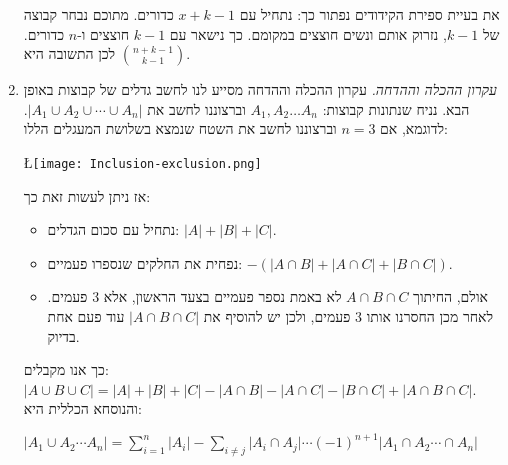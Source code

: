 \documentclass[12pt,a4paper]{article}
\begin{document}
\begin{enumerate}[label=\textcolor{BurntOrange}{שאלה \arabic*: }]
\begin{Solution}
את בעיית ספירת הקידודים נפתור כך: נתחיל עם $x+k-1$ כדורים. מתוכם נבחר קבוצה של $k-1$, נזרוק אותם ונשים חוצצים במקומם. כך נישאר עם $k-1$ חוצצים ו-$n$ כדורים. לכן התשובה היא $\binom{n+k-1}{k-1}$.
\end{Solution}
\item \textit{עקרון ההכלה וההדחה.} עקרון ההכלה וההדחה מסייע לנו לחשב גדלים של קבוצות באופן הבא. נניח שנתונות קבוצות: $A_1 , A_2 \dots A_n$ וברצוננו לחשב את $\lvert A_1 \cup A_2 \cup \cdots \cup A_n \rvert$. לדוגמא, אם $n=3$ וברצוננו לחשב את השטח שנמצא בשלושת המעגלים הללו:
\begin{center}
\L {\texttt{[image: Inclusion-exclusion.png]}}
\end{center}
אז ניתן לעשות זאת כך:
\begin{itemize}
\item נתחיל עם סכום הגדלים: $\lvert A \rvert + \lvert B \rvert + \lvert C \rvert$.
\item נפחית את החלקים שנספרו פעמיים: $-(\lvert A \cap B \rvert + \lvert A \cap C \rvert + \lvert B \cap C \rvert)$.
\item אולם, החיתוך $A \cap B \cap C$ לא באמת נספר פעמיים בצעד הראשון, אלא 3 פעמים. לאחר מכן החסרנו אותו 3 פעמים, ולכן יש להוסיף את $\lvert A \cap B \cap C \rvert$ עוד פעם אחת בדיוק.
\end{itemize}
כך אנו מקבלים: $\lvert A \cup B \cup C \rvert = \lvert A \rvert + \lvert B \rvert + \lvert C \rvert - \lvert A \cap B \rvert - \lvert A \cap C \rvert - \lvert B \cap C \rvert + \lvert A \cap B \cap C \rvert$. \\
והנוסחא הכללית היא:
\begin{center}
$\lvert A_1 \cup A_2 \cdots A_n \rvert = \sum\limits_{i=1}^n \lvert A_i \rvert - \sum\limits_{i \neq j} \lvert A_i \cap A_j \rvert \cdots (-1)^{n+1} \lvert A_1 \cap A_2 \cdots \cap A_n \rvert$
\end{center}
\end{enumerate}
\end{document}
